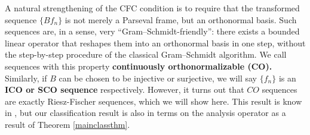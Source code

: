 \documentclass[11pt]{amsart}
\theoremstyle{definition}
\numberwithin{equation}{section}
\begin{document}
A natural strengthening of the CFC condition is to require that the transformed sequence $\{Bf_n\}$ is not merely a Parseval frame, but an orthonormal basis. Such sequences are, in a sense, very “Gram–Schmidt-friendly”: there exists a bounded linear operator that reshapes them into an orthonormal basis in one step, without the step-by-step procedure of the classical Gram–Schmidt algorithm. We call sequences with this property \textbf{continuously orthonormalizable (CO).} Similarly, if $B$ can be chosen to be injective or surjective, we will say $\{f_n\}$ is an \textbf{ICO or SCO sequence} respectively. However, it turns out that $CO$ sequences are exactly Riesz-Fischer sequences, which we will show here. This result is know in \cite{Casazza2002Riesz-Fischer}, but our classification result is also in terms on the analysis operator as a result of Theorem \ref{mainclassthm}.
\end{document}
